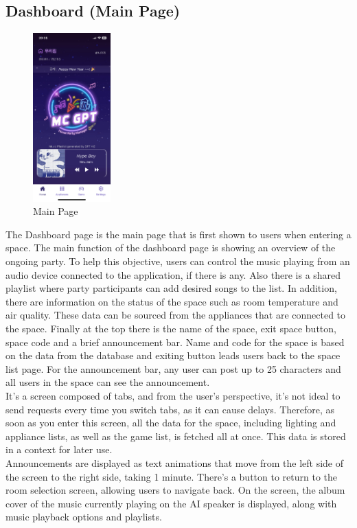\documentclass[conference]{IEEEtran}
\begin{document}
    \subsection{Dashboard (Main Page)}
        \begin{figure}[htbp]
            \centerline{\includegraphics[width=3cm]{Images/screen/home/1_HOME_MYHOME.PNG}}
            \caption{Main Page}
            \label{fig}
        \end{figure}
        The Dashboard page is the main page that is first shown to users when entering a space. The main function of the dashboard page is showing an overview of the ongoing party. To help this objective, users can control the music playing from an audio device connected to the application, if there is any. Also there is a shared playlist where party participants can add desired songs to the list. In addition, there are information on the status of the space such as room temperature and air quality. These data can be sourced from the appliances that are connected to the space. Finally at the top there is the name of the space, exit space button, space code and a brief announcement bar. Name and code for the space is based on the data from the database and exiting button leads users back to the space list page. For the announcement bar, any user can post up to 25 characters and all users in the space can see the announcement.\\
        It's a screen composed of tabs, and from the user's perspective, it's not ideal to send requests every time you switch tabs, as it can cause delays. Therefore, as soon as you enter this screen, all the data for the space, including lighting and appliance lists, as well as the game list, is fetched all at once. This data is stored in a context for later use.\\        
        Announcements are displayed as text animations that move from the left side of the screen to the right side, taking 1 minute. There's a button to return to the room selection screen, allowing users to navigate back. On the screen, the album cover of the music currently playing on the AI speaker is displayed, along with music playback options and playlists.
\end{document}
